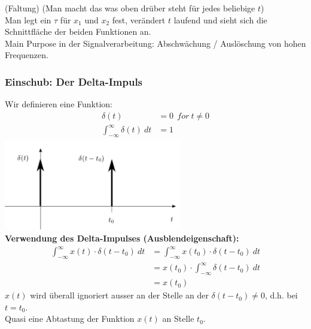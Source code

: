 \documentclass[12pt,a4paper]{scrartcl}
\begin{document}
    \noindent(Faltung) (Man macht das was oben drüber steht für jedes beliebige $t$)\\
    \noindent Man legt ein $\tau$ für $x_1$ und $x_2$ fest, verändert $t$ laufend und sieht sich die Schnittfläche der beiden Funktionen an. \\

    \noindent Main Purpose in der Signalverarbeitung: Abschwächung / Auslöschung von hohen Frequenzen.

  \subsubsection{Einschub: Der Delta-Impuls}
  \label{sec:sub:sub:delta-impuls}

  \noindent Wir definieren eine Funktion:
  \begin{equation}
    \label{eq:8}
    \begin{split}
    \delta (t) &= 0\ \ for\ t \neq 0 \\    
    \int_{-\infty}^{\infty} \delta (t)\ d t &= 1
    \end{split}
    \end{equation}
  \includegraphics[height=4cm]{Pictures/DeltaImpuls.png} \\

  \noindent  \textbf{Verwendung des Delta-Impulses (Ausblendeigenschaft):}
  \begin{equation}
    \label{eq:9}
    \begin{split}
    \int_{-\infty}^{\infty} x(t) \cdot \delta(t-t_0)\ d t &= \int_{-\infty}^{\infty} x(t_0) \cdot \delta (t-t_0)\ d t \\    
    &= x(t_0) \cdot \int_{-\infty}^{\infty} \delta (t-t_0)\ dt \\
    &=x(t_0)
    \end{split}
    \end{equation}
    \noindent $x(t)$ wird überall ignoriert ausser an der Stelle an der $\delta(t-t_0) \neq 0$, d.h. bei $t = t_0$.\\
    Quasi eine Abtastung der Funktion $x(t)$ an Stelle $t_0$.\\
\end{document}
